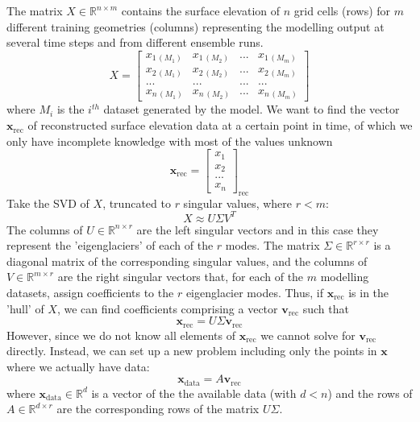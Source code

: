 \documentclass[a4paper]{article}
\begin{document}
The matrix $X \in \mathbb{R}^{n\times m}$ contains the surface elevation of $n$ grid cells (rows) for $m$ different training geometries (columns) representing the modelling output at several time steps and from different ensemble runs.
\begin{equation}
    X =
    \begin{bmatrix}
        x_{1\,(M_1)} & x_{1\,(M_2)} & ... & x_{1\,(M_m)}\\
        x_{2\,(M_1)} & x_{2\,(M_2)} & ... & x_{2\,(M_m)}\\
        ...          & ...          & ... & ...     \\
        x_{n\,(M_1)} & x_{n\,(M_2)} & ... & x_{n\,(M_m)}
    \end{bmatrix}
\end{equation}
where $M_i$ is the $i^{th}$ dataset generated by the model.
We want to find the vector $\mathbf{x}_\mathrm{rec}$ of reconstructed surface elevation data at a certain point in time, of which we only have incomplete knowledge with most of the values unknown
\begin{equation}
    \mathbf{x}_\mathrm{rec} =
    \begin{bmatrix}
        x_1\\
        x_2\\
        ...\\
        x_n
    \end{bmatrix}_{\mathrm{rec}}
\end{equation}
Take the SVD of $X$, truncated to $r$ singular values, where $r<m$:
\begin{equation}
    X \approx U \Sigma V^T
\end{equation}
The columns of $U \in \mathbb{R}^{n\times r}$ are the left singular vectors and in this case they represent the 'eigenglaciers' of each of the $r$ modes. The matrix $\Sigma \in \mathbb{R}^{r\times r}$ is a diagonal matrix of the corresponding singular values, and the columns of $V \in \mathbb{R}^{m\times r}$ are the right singular vectors that, for each of the $m$ modelling datasets, assign coefficients to the $r$ eigenglacier modes. Thus, if $\mathbf{x}_\mathrm{rec}$ is in the 'hull' of $X$, we can find coefficients comprising a vector $\mathbf{v}_\mathrm{rec}$ such that
\begin{equation}
    \mathbf{x}_\mathrm{rec} = U \Sigma \mathbf{v}_\mathrm{rec}
\end{equation}
However, since we do not know all elements of $\mathbf{x}_\mathrm{rec}$ we cannot solve for $\mathbf{v}_\mathrm{rec}$ directly. Instead, we can set up a new problem including only the points in $\mathbf{x}$ where we actually have data:
\begin{equation}
    \mathbf{x}_\mathrm{data} = A\mathbf{v}_\mathrm{rec}
\end{equation}
where $\mathbf{x}_\mathrm{data} \in \mathbb{R}^d$ is a vector of the the available data (with $d<n$) and the rows of $A\in \mathbb{R}^{d\times r}$ are the corresponding rows of the matrix $U \Sigma$.
\end{document}
